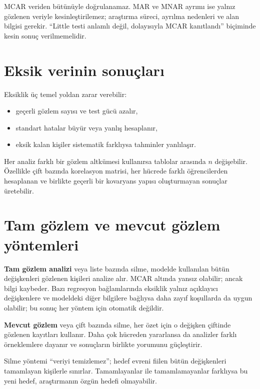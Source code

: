 MCAR veriden bütünüyle doğrulanamaz. MAR ve MNAR ayrımı ise yalnız gözlenen
veriyle kesinleştirilemez; araştırma süreci, ayrılma nedenleri ve alan bilgisi
gerekir. ``Little testi anlamlı değil, dolayısıyla MCAR kanıtlandı'' biçiminde
kesin sonuç verilmemelidir.

\section{Eksik verinin sonuçları}

Eksiklik üç temel yoldan zarar verebilir:

\begin{itemize}
  \item geçerli gözlem sayısı ve test gücü azalır,
  \item standart hatalar büyür veya yanlış hesaplanır,
  \item eksik kalan kişiler sistematik farklıysa tahminler yanlılaşır.
\end{itemize}

Her analiz farklı bir gözlem altkümesi kullanırsa tablolar arasında $n$
değişebilir. Özellikle çift bazında korelasyon matrisi, her hücrede farklı
öğrencilerden hesaplanan ve birlikte geçerli bir kovaryans yapısı oluşturmayan
sonuçlar üretebilir.

\section{Tam gözlem ve mevcut gözlem yöntemleri}

\textbf{Tam gözlem analizi} veya liste bazında silme, modelde kullanılan bütün
değişkenleri gözlenen kişileri analize alır. MCAR altında yansız olabilir;
ancak bilgi kaybeder. Bazı regresyon bağlamlarında eksiklik yalnız açıklayıcı
değişkenlere ve modeldeki diğer bilgilere bağlıysa daha zayıf koşullarda da
uygun olabilir; bu sonuç her yöntem için otomatik değildir.

\textbf{Mevcut gözlem} veya çift bazında silme, her özet için o değişken
çiftinde gözlenen kayıtları kullanır. Daha çok hücreden yararlansa da analizler
farklı örneklemlere dayanır ve sonuçların birlikte yorumunu güçleştirir.

\begin{sezgibox}
Silme yöntemi ``veriyi temizlemez''; hedef evreni fiilen bütün değişkenleri
tamamlayan kişilerle sınırlar. Tamamlayanlar ile tamamlamayanlar farklıysa bu
yeni hedef, araştırmanın özgün hedefi olmayabilir.
\end{sezgibox}

